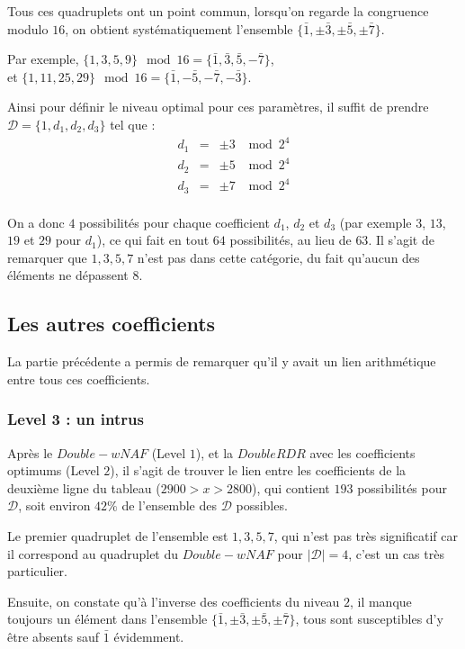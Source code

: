 \documentclass[12pt, a4paper]{memoir}
\begin{document}
  Tous ces quadruplets ont un point commun, lorsqu'on regarde la congruence modulo $16$, on obtient systématiquement
  l'ensemble $\{\bar{1},\pm\bar{3},\pm\bar{5},\pm\bar{7}\}$.
  
  Par exemple, $\{1,3,5,9\} \mod 16 = \{\bar{1},\bar{3},\bar{5},-\bar{7}\}$, \\
  et $\{1,11,25,29\} \mod 16 = \{\bar{1},-\bar{5},-\bar{7},-\bar{3}\}$.
  
  Ainsi pour définir le niveau optimal pour ces paramètres, il suffit de prendre 
  $\mathcal{D} = \{1,d_1,d_2,d_3\}$ tel que : \\
 $$\begin{array}{ccc}
d_1 & = & \pm 3 \,\, \mod 2^4 \\ 
d_2 & = & \pm 5 \,\, \mod 2^4 \\
d_3 & = & \pm 7 \,\, \mod 2^4 \\
   \end{array}$$
  
  On a donc $4$ possibilités pour chaque coefficient $d_1$, $d_2$ et $d_3$ (par exemple 
  $3$, $13$, $19$ et $29$ pour $d_1$), ce qui fait en tout $64$ possibilités, au lieu de $63$.
  Il s'agit de remarquer que $1,3,5,7$ n'est pas dans cette catégorie, du fait qu'aucun des éléments 
  ne dépassent $8$.
  
  \subsection{Les autres coefficients}
  
  La partie précédente a permis de remarquer qu'il y avait un lien arithmétique entre tous ces coefficients.
  
  \subsubsection{Level 3 : un intrus}
  
  Après le $Double-wNAF$ (Level $1$), et la $DoubleRDR$ avec les coefficients optimums (Level $2$), il s'agit de 
  trouver le lien entre les coefficients de la deuxième ligne du tableau ($2900 > x > 2800$), qui contient
  $193$ possibilités pour $\mathcal{D}$, soit environ $42 \%$ de l'ensemble des $\mathcal{D}$ possibles.
  
  Le premier quadruplet de l'ensemble est $1,3,5,7$, qui n'est pas très significatif car il correspond au 
  quadruplet du $Double-wNAF$ pour $|\mathcal{D}| = 4$, c'est un cas très particulier.
  
  Ensuite, on constate qu'à l'inverse des coefficients du niveau $2$, il manque toujours un élément dans 
  l'ensemble $\{\bar{1},\pm\bar{3},\pm\bar{5},\pm\bar{7}\}$, tous sont susceptibles d'y être absents sauf
  $\bar{1}$ évidemment.
  
\end{document}

